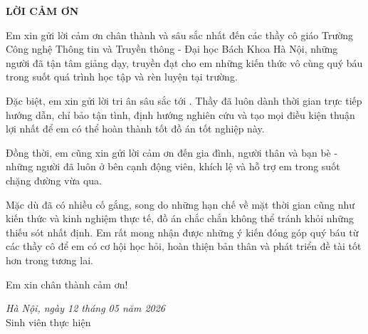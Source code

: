 \documentclass[../main.tex]{subfiles}
\begin{document}
\begin{center}
    \textbf{\huge LỜI CẢM ƠN}
\end{center}
\vspace{0.5cm}

Em xin gửi lời cảm ơn chân thành và sâu sắc nhất đến các thầy cô giáo Trường Công nghệ Thông tin và Truyền thông - Đại học Bách Khoa Hà Nội, những người đã tận tâm giảng dạy, truyền đạt cho em những kiến thức vô cùng quý báu trong suốt quá trình học tập và rèn luyện tại trường.

Đặc biệt, em xin gửi lời tri ân sâu sắc tới \textbf{\INSTRUCTOR}. Thầy đã luôn dành thời gian trực tiếp hướng dẫn, chỉ bảo tận tình, định hướng nghiên cứu và tạo mọi điều kiện thuận lợi nhất để em có thể hoàn thành tốt đồ án tốt nghiệp này.

Đồng thời, em cũng xin gửi lời cảm ơn đến gia đình, người thân và bạn bè - những người đã luôn ở bên cạnh động viên, khích lệ và hỗ trợ em trong suốt chặng đường vừa qua.

Mặc dù đã có nhiều cố gắng, song do những hạn chế về mặt thời gian cũng như kiến thức và kinh nghiệm thực tế, đồ án chắc chắn không thể tránh khỏi những thiếu sót nhất định. Em rất mong nhận được những ý kiến đóng góp quý báu từ các thầy cô để em có cơ hội học hỏi, hoàn thiện bản thân và phát triển đề tài tốt hơn trong tương lai.

Em xin chân thành cảm ơn!

\begin{flushright}
    \textit{Hà Nội, ngày 12 tháng 05 năm 2026} \\
    Sinh viên thực hiện \\
    \vspace{2cm}
    \textbf{\AUTHOR}
\end{flushright}
\end{document}
